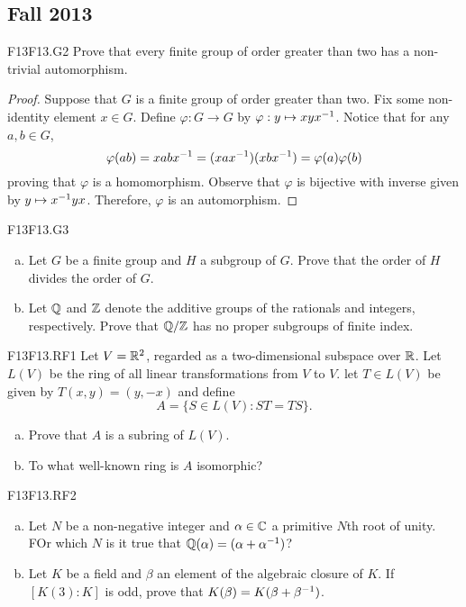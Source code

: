 \documentclass[../AlgebraQualSolutions.tex]{subfiles}
\begin{document}
\subsection{Fall 2013}

\begin{prob}{F13}{F13.G2}
	Prove that every finite group of order greater than two has a non-trivial automorphism.
\end{prob}

\begin{proof}
Suppose that $G$ is a finite group of order greater than two. Fix some non-identity element $x \in G$. Define $\varphi: G \to G$ by $\varphi: y \mapsto xyx^{-1}$. Notice that for any $a,b \in G$,
	\[\varphi(ab) = xabx^{-1} = (xax^{-1})(xbx^{-1}) = \varphi(a)\varphi(b) \]
proving that $\varphi$ is a homomorphism. Observe that $\varphi$ is bijective with inverse given by $y \mapsto x^{-1} y x$. Therefore, $\varphi$ is an automorphism.
\end{proof}

\begin{prob}{F13}{F13.G3}

	\begin{enumerate}[(a)]
		\item Let $G$ be a finite group and $H$ a subgroup of $G$. Prove that the order of $H$ divides the order of $G$.
		\item  Let $\mathbb{Q}$ and $\mathbb{Z}$ denote the additive groups of the rationals and integers, respectively. Prove that $\mathbb{Q}/\mathbb{Z}$ has no proper subgroups of finite index.
	\end{enumerate}
\end{prob}

\begin{prob}{F13}{F13.RF1}
	Let $V = \mathbb{R}^2$, regarded as a two-dimensional subspace over $\mathbb{R}$. Let $L(V)$ be the ring of all linear transformations from $V$ to $V$. let $T \in L(V)$ be given by $T(x,y) = (y,-x)$ and define 
		\[A = \{S \in L(V): ST = TS\}. \]
	\begin{enumerate}[(a)]
		\item Prove that $A$ is a subring of $L(V)$.
		\item To what well-known ring is $A$ isomorphic?
	\end{enumerate}
\end{prob}

\begin{prob}{F13}{F13.RF2}

	\begin{enumerate}[(a)]
		\item Let $N$ be a non-negative integer and $\alpha \in \mathbb{C}$ a primitive $N$th root of unity. FOr which $N$ is it true that $\mathbb{Q}(\alpha) = (\alpha + \alpha^{-1})$?
		\item Let $K$ be a field and $\beta$ an element of the algebraic closure of $K$. If $[K(3):K]$ is odd, prove that $K(\beta) = K(\beta + \beta^{-1})$.
	\end{enumerate}
\end{prob}
\end{document}
